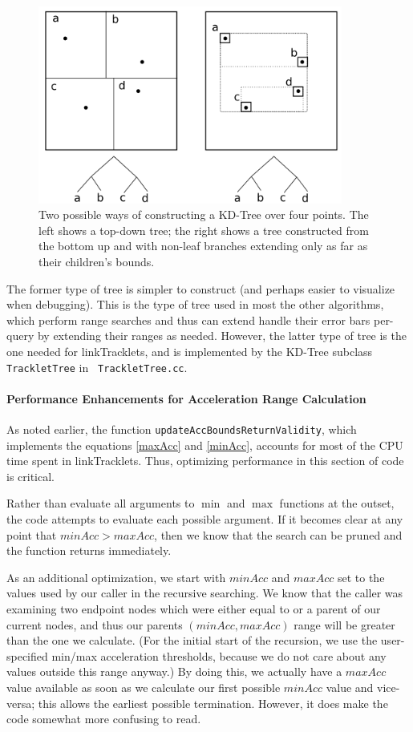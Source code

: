 \begin{figure}[ht!]
\centering
\includegraphics[width=10cm]{illustrations/kdTree_trackletTree.png}
\caption[KD-tree construction example.]{Two possible ways of
  constructing a KD-Tree over four points. The left shows a top-down
  tree; the right shows a tree constructed from the bottom up and with
non-leaf branches extending only as far as their children's bounds. }
\label{trackletTree}
\end{figure}

The former type of tree is simpler to construct (and perhaps easier to
visualize when debugging).  This is the type of tree used in most the
other algorithms, which perform range searches and thus can extend
handle their error bars per-query by extending their ranges as needed.
However, the latter type of tree is the one needed for linkTracklets,
and is implemented by the KD-Tree subclass {\tt TrackletTree} in {\tt
  TrackletTree.cc}.


\paragraph{Performance Enhancements for Acceleration Range Calculation}
As noted earlier, the function {\tt updateAccBoundsReturnValidity},
which implements the equations \ref{maxAcc} and \ref{minAcc},
accounts for most of the CPU time spent in linkTracklets.  Thus,
optimizing performance in this section of code is critical.

Rather than evaluate all arguments to $\min$ and $\max$ functions at
the outset, the code attempts to evaluate each possible argument. If
it becomes clear at any point that $minAcc > maxAcc$, then
we know that the search can be pruned and the function returns
immediately.

As an additional optimization, we start with $minAcc$ and $maxAcc$ set
to the values used by our caller in the recursive searching. We know
that the caller was examining two endpoint nodes which were either
equal to or a parent of our current nodes, and thus our parents
$(minAcc, maxAcc)$ range will be greater than the one we
calculate. (For the initial start of the recursion, we use the
user-specified min/max acceleration thresholds, because we do not care
about any values outside this range anyway.)  By doing this, we
actually have a $maxAcc$ value available as soon as we calculate our
first possible $minAcc$ value and vice-versa; this allows the earliest
possible termination.  However, it does make the code somewhat more
confusing to read.

